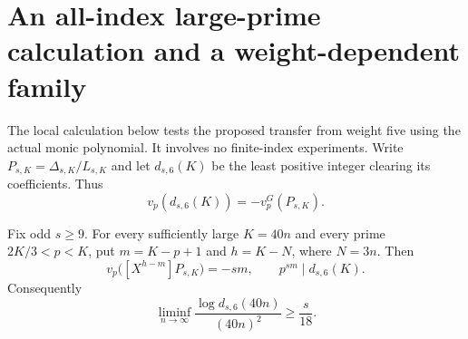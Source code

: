 \section{An all-index large-prime calculation and a weight-dependent family}
\label{sec:forced-hankel-depth}

The local calculation below tests the proposed transfer from weight five
using the actual monic polynomial. It involves no finite-index experiments.
Write $P_{s,K}=\Delta_{s,K}/L_{s,K}$ and let $d_{s,6}(K)$ be the least
positive integer clearing its coefficients. Thus
\[
 v_p(d_{s,6}(K))=-v_p^G(P_{s,K}).
\]

\begin{proposition}\label{prop:forced-large-prime-depth}
Fix odd $s\ge9$. For every sufficiently large $K=40n$ and every prime
$2K/3<p<K$, put $m=K-p+1$ and $h=K-N$, where $N=3n$.
Then
\[
 v_p\bigl([X^{h-m}]P_{s,K}\bigr)=-sm,
 \qquad p^{sm}\mid d_{s,6}(K).                         \tag{D1}
\]
Consequently
\[
 \liminf_{n\to\infty}\frac{\log d_{s,6}(40n)}{(40n)^2}
 \ge \frac{s}{18}.                                    \tag{D2}
\]
\end{proposition}
